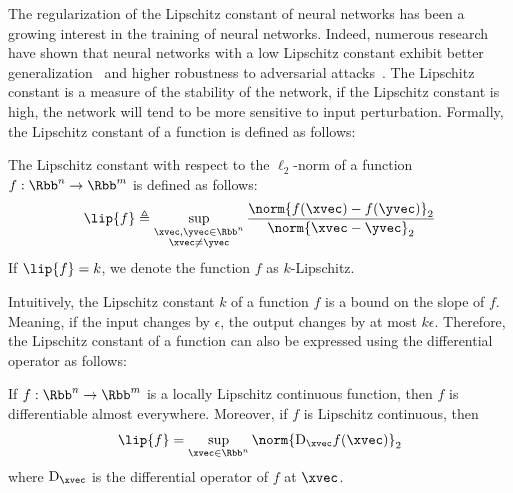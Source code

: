 
The regularization of the Lipschitz constant of neural networks has been a growing interest in the training of neural networks.
Indeed, numerous research have shown that neural networks with a low Lipschitz constant exhibit better generalization~\cite{bartlett2017spectrally} and higher robustness to adversarial attacks~\cite{szegedy2013intriguing,tsuzuku2018lipschitz, farnia2018generalizable}.
The Lipschitz constant is a measure of the stability of the network, if the Lipschitz constant is high, the network will tend to be more sensitive to input perturbation.
Formally, the Lipschitz constant of a function is defined as follows: 
\begin{definition}
  The Lipschitz constant with respect to the $\ell_2$-norm of a function $f: \Rbb^n \rightarrow \Rbb^m$ is defined as follows:
  \begin{equation}
    \lip{f} \triangleq \sup_{\substack{\xvec, \yvec \in \Rbb^n \\ \xvec \neq \yvec}} \frac{\norm{f(\xvec) - f(\yvec)}_2}{\norm{\xvec - \yvec}_2}
  \end{equation}
  If $\lip{f}=k$, we denote the function $f$ as $k$-Lipschitz.
  \label{definition:ch3-lipschitz_constant}
\end{definition}
\noindent
Intuitively, the Lipschitz constant $k$ of a function $f$ is a bound on the slope of $f$.
Meaning, if the input changes by $\epsilon$, the output changes by at most $k\epsilon$.
Therefore, the Lipschitz constant of a function can also be expressed using the differential operator as follows:
\begin{theorem}
  If $f: \Rbb^n \rightarrow \Rbb^m$ is a locally Lipschitz continuous function, then $f$ is differentiable almost everywhere. Moreover, if $f$ is Lipschitz continuous, then
  \begin{align}
    \lip{f} = \sup_{\xvec \in \Rbb^n} \norm{\mathrm{D}_\xvec f(\xvec)}_2
  \end{align}
  where $\mathrm{D}_\xvec$ is the differential operator of $f$ at $\xvec$.
  \label{theorem:ch3-lipschitz_differential_op}
\end{theorem}


